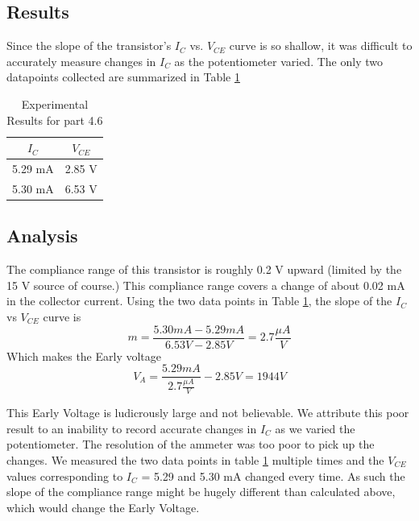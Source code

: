\documentclass[12pt,letterpaper]{report}
\begin{document}
\subsection*{Results}
Since the slope of the transistor's $I_C$ vs. $V_{CE}$ curve is so shallow, it was difficult to accurately measure changes in $I_C$ as the potentiometer varied. The only two datapoints collected are summarized in Table \ref{table:4-6_results}

\begin{table}[ht]
\caption{Experimental Results for part 4.6} %
\centering 
    \begin{tabular}{| c | c |}
    \hline  
    $I_C$ & $V_{CE}$\\
    \hline
    5.29 mA & 2.85 V\\
    5.30 mA & 6.53 V\\
    \hline
    \end{tabular}
    \label{table:4-6_results}
\end{table}

\subsection*{Analysis}
The compliance range of this transistor is roughly 0.2 V upward (limited by the 15 V source of course.) This compliance range covers a change of about 0.02 mA in the collector current. Using the two data points in Table \ref{table:4-6_results}, the slope of the $I_C$ vs $V_{CE}$ curve is
$$
m = \frac{5.30 mA - 5.29 mA}{6.53V - 2.85V} = 2.7 \frac{\mu A}{V}
$$
Which makes the Early voltage
$$
V_A = \frac{5.29 mA}{2.7 \frac{\mu A}{V}} - 2.85 V = 1944 V
$$

This Early Voltage is ludicrously large and not believable. We attribute this poor result to an inability to record accurate changes in $I_C$ as we varied the potentiometer. The resolution of the ammeter was too poor to pick up the changes. We measured the two data points in table \ref{table:4-6_results} multiple times and the $V_{CE}$ values corresponding to $I_C$ = 5.29 and 5.30 mA changed every time. As such the slope of the compliance range might be hugely different than calculated above, which would change the Early Voltage.
\end{document}
